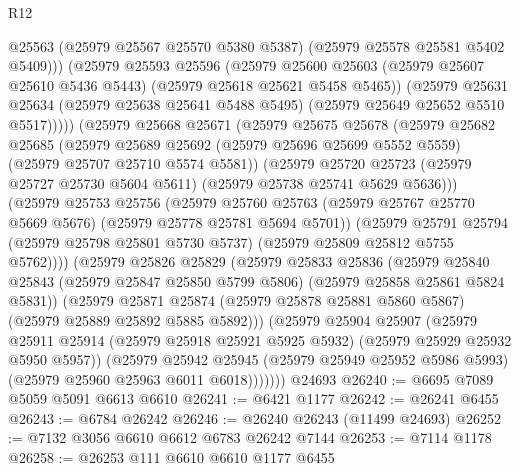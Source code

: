 \begin{lexlean}{R12}
\begin{coremodule}
                @25563
                (@25979 @25567 @25570 @5380 @5387)
                (@25979 @25578 @25581 @5402 @5409)))
            (@25979
              @25593
              @25596
              (@25979
                @25600
                @25603
                (@25979 @25607 @25610 @5436 @5443)
                (@25979 @25618 @25621 @5458 @5465))
              (@25979
                @25631
                @25634
                (@25979 @25638 @25641 @5488 @5495)
                (@25979 @25649 @25652 @5510 @5517)))))
        (@25979
          @25668
          @25671
          (@25979
            @25675
            @25678
            (@25979
              @25682
              @25685
              (@25979
                @25689
                @25692
                (@25979 @25696 @25699 @5552 @5559)
                (@25979 @25707 @25710 @5574 @5581))
              (@25979
                @25720
                @25723
                (@25979 @25727 @25730 @5604 @5611)
                (@25979 @25738 @25741 @5629 @5636)))
            (@25979
              @25753
              @25756
              (@25979
                @25760
                @25763
                (@25979 @25767 @25770 @5669 @5676)
                (@25979 @25778 @25781 @5694 @5701))
              (@25979
                @25791
                @25794
                (@25979 @25798 @25801 @5730 @5737)
                (@25979 @25809 @25812 @5755 @5762))))
          (@25979
            @25826
            @25829
            (@25979
              @25833
              @25836
              (@25979
                @25840
                @25843
                (@25979 @25847 @25850 @5799 @5806)
                (@25979 @25858 @25861 @5824 @5831))
              (@25979
                @25871
                @25874
                (@25979 @25878 @25881 @5860 @5867)
                (@25979 @25889 @25892 @5885 @5892)))
            (@25979
              @25904
              @25907
              (@25979
                @25911
                @25914
                (@25979 @25918 @25921 @5925 @5932)
                (@25979 @25929 @25932 @5950 @5957))
              (@25979
                @25942
                @25945
                (@25979 @25949 @25952 @5986 @5993)
                (@25979 @25960 @25963 @6011 @6018)))))))
    @24693
@26240 := @6695 @7089 @5059 @5091 @6613 @6610
@26241 := @6421 @1177
@26242 := @26241 @6455
@26243 := @6784 @26242
@26246 := @26240 @26243 (@11499 @24693)
@26252 := @7132 @3056 @6610 @6612 @6783 @26242 @7144
@26253 := @7114 @1178
@26258 := @26253 @111 @6610 @6610 @1177 @6455

\end{coremodule}
\end{lexlean}
